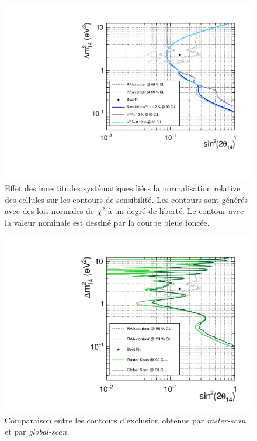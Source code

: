 {\begin{figure}[h!]
\clearpage

\end{figure}

\begin{figure}[h!]

\centering
\includegraphics[width=0.78\linewidth]{images/contours_NU.pdf}
\caption[Effet des incertitudes systématiques liées la normalisation relative des cellules sur les contours de sensibilité]{Effet des incertitudes systématiques liées la normalisation relative des cellules sur les contours de sensibilité. Les contours sont générés avec des lois normales de $\chi^2$ à un degré de liberté. Le contour avec la valeur nominale est dessiné par la courbe bleue foncée.}
\label{fig:contours_NU.pdf}

\end{figure}


\begin{figure}[h!]

\centering
\includegraphics[width=0.78\linewidth]{images/contours_global_vs_raster.pdf}
\caption[Comparaison entre les contours d'exclusion obtenus par \textit{raster-scan} et par \textit{global-scan}]{Comparaison entre les contours d'exclusion obtenus par \textit{raster-scan} et par \textit{global-scan}.}
\label{fig:contours_global_vs_raster.pdf}

\end{figure}

\clearpage

}

